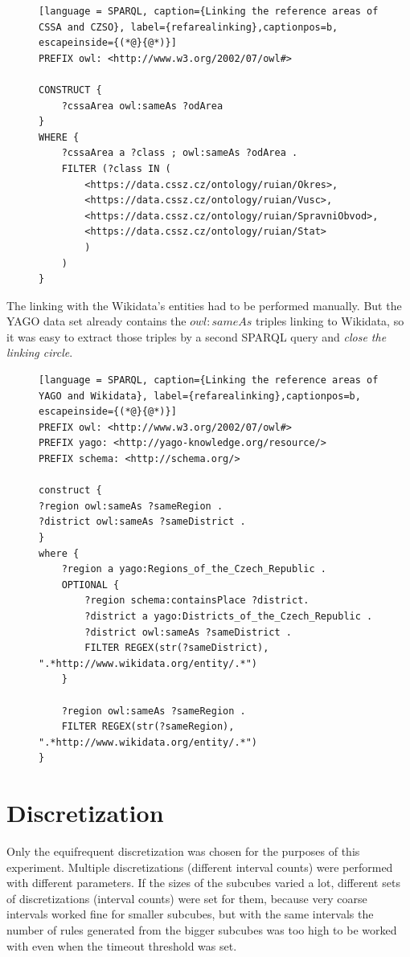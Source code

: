 \begin{figure}[h]
\begin{lstlisting}[language = SPARQL, caption={Linking the reference areas of CSSA and CZSO}, label={refarealinking},captionpos=b, escapeinside={(*@}{@*)}]
PREFIX owl: <http://www.w3.org/2002/07/owl#>

CONSTRUCT {
    ?cssaArea owl:sameAs ?odArea
}
WHERE {
    ?cssaArea a ?class ; owl:sameAs ?odArea .
    FILTER (?class IN (
        <https://data.cssz.cz/ontology/ruian/Okres>,
        <https://data.cssz.cz/ontology/ruian/Vusc>,
        <https://data.cssz.cz/ontology/ruian/SpravniObvod>,
        <https://data.cssz.cz/ontology/ruian/Stat>
        )
    )
}
\end{lstlisting}
\end{figure}

The linking with the Wikidata's entities had to be performed manually. But the YAGO data set already contains the $owl:sameAs$ triples linking to Wikidata, so it was easy to extract those triples by a second SPARQL query and \textit{close the linking circle}.

\begin{figure}[h]
\begin{lstlisting}[language = SPARQL, caption={Linking the reference areas of YAGO and Wikidata}, label={refarealinking},captionpos=b, escapeinside={(*@}{@*)}]
PREFIX owl: <http://www.w3.org/2002/07/owl#>
PREFIX yago: <http://yago-knowledge.org/resource/>
PREFIX schema: <http://schema.org/>
    
construct {
?region owl:sameAs ?sameRegion .
?district owl:sameAs ?sameDistrict .
}
where {
    ?region a yago:Regions_of_the_Czech_Republic .
    OPTIONAL {
        ?region schema:containsPlace ?district.
        ?district a yago:Districts_of_the_Czech_Republic .
        ?district owl:sameAs ?sameDistrict .
        FILTER REGEX(str(?sameDistrict), ".*http://www.wikidata.org/entity/.*")
    } 
    
    ?region owl:sameAs ?sameRegion .  
    FILTER REGEX(str(?sameRegion), ".*http://www.wikidata.org/entity/.*")
}
\end{lstlisting}
\end{figure}

\section{Discretization\label{discretization}}

Only the equifrequent discretization was chosen for the purposes of this experiment. Multiple discretizations (different interval counts) were performed with different parameters. If the sizes of the subcubes varied a lot, different sets of discretizations (interval counts) were set for them, because very coarse intervals worked fine for smaller subcubes, but with the same intervals the number of rules generated from the bigger subcubes was too high to be worked with even when the timeout threshold was set.

